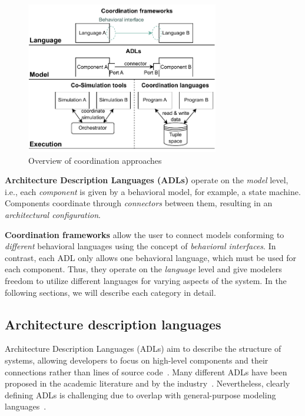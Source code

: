 \documentclass[runningheads]{llncs}
\begin{document}
\begin{figure}[ht]
	\centering
	\includegraphics[width=0.75\textwidth]{images/overview}
	\caption{Overview of coordination approaches}
	\label{fig:overview}
\end{figure}

\textbf{Architecture Description Languages (ADLs)} operate on the \textit{model} level, i.e., each \textit{component} is given by a behavioral model, for example, a state machine.
Components coordinate through \textit{connectors} between them, resulting in an \textit{architectural configuration}.

\textbf{Coordination frameworks} allow the user to connect models conforming to \textit{different} behavioral languages using the concept of \textit{behavioral interfaces}.
In contrast, each ADL only allows one behavioral language, which must be used for each component.
Thus, they operate on the \textit{language} level and give modelers freedom to utilize different languages for varying aspects of the system.
In the following sections, we will describe each category in detail.

\subsection{Architecture description languages} \label{subsec:adl}
Architecture Description Languages (ADLs) aim to describe the structure of systems, allowing developers to focus on high-level components and their connections rather than lines of source code~\cite{clementsSurveyArchitectureDescription1996,medvidovicClassificationComparisonFramework2000,medvidovicFrameworkClassifyingComparing1997}.
Many different ADLs have been proposed in the academic literature and by the industry~\cite{medvidovicClassificationComparisonFramework2000,woodsArchitectureDescriptionLanguages2005}.
Nevertheless, clearly defining ADLs is challenging due to overlap with general-purpose modeling languages~\cite{clementsSurveyArchitectureDescription1996}.
\end{document}

